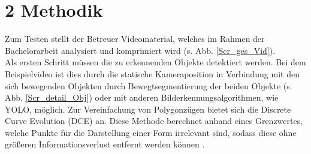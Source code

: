 \documentclass[a4paper,11pt,pdftex, parskip]{scrreprt}
\begin{document}
\section*{2 Methodik}{
Zum Testen stellt der Betreuer Videomaterial, welches im Rahmen der Bachelorarbeit analysiert und komprimiert wird (s. Abb. \ref{Scr_ges_Vid}). \\
Als ersten Schritt müssen die zu erkennenden Objekte detektiert werden. Bei dem Beispielvideo ist dies durch die statische Kameraposition in Verbindung mit den sich bewegenden Objekten durch Bewegtsegmentierung der beiden Objekte (s. Abb. \ref{Scr_detail_Obj}) oder mit anderen Bilderkennungsalgorithmen, wie YOLO, möglich.\newline
Zur Vereinfachung von Polygonzügen bietet sich die Discrete Curve Evolution (DCE) an. Diese Methode berechnet anhand eines Grenzwertes, welche Punkte für die Darstellung einer Form irrelevant sind, sodass diese ohne größeren Informationsverlust entfernt werden können \citep{Barkowsky2000}. 

}
\end{document}

